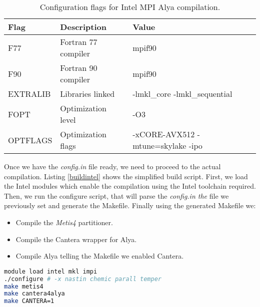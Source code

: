 \begin{table}[htbp]
\centering
\begin{tabular}{l|l|l} 
\toprule
\textbf{Flag}     & \textbf{Description}         & \textbf{Value}                                                                       \\ 
\hline
F77      & Fortran 77 compiler & mpif90                                                                      \\ 
\hline
F90      & Fortran 90 compiler & mpif90                                                                      \\ 
\hline
EXTRALIB & Libraries linked    & -lmkl\_core -lmkl\_sequential                                               \\ 
\hline 
FOPT     & Optimization level  & -O3                                                                         \\ 
\hline
OPTFLAGS & Optimization flags  & -xCORE-AVX512 -mtune=skylake -ipo                                           \\
\bottomrule
\end{tabular}
\caption{Configuration flags for Intel MPI Alya compilation.}
\label{flagsintel}
\end{table}

Once we have the \textit{config.in} file ready, we need to proceed to the actual compilation. Listing \ref{buildintel} shows the simplified build script. First, we load the Intel modules which enable the compilation using the Intel toolchain required. Then, we run the configure script, that will parse the \textit{config.in the} file we previously set and generate the Makefile. Finally using the generated Makefile we:

\begin{itemize}
  \item Compile the \textit{Metis4} partitioner.
  \item Compile the Cantera wrapper for Alya.
  \item Compile Alya telling the Makefile we enabled Cantera.
\end{itemize}

\begin{lstlisting}[language=sh, caption={Building Alya}, label={buildintel}]
module load intel mkl impi
./configure # -x nastin chemic parall temper
make metis4
make cantera4alya 
make CANTERA=1
\end{lstlisting}

